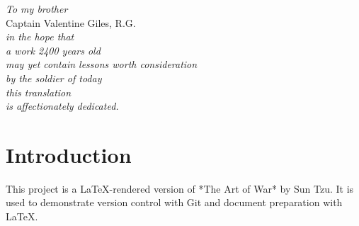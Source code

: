 \documentclass[12pt,a4paper]{book}
\begin{document}
\vspace{0em}

\noindent\hrulefill

\vspace{0em}

\begin{center}
\textit{To my brother} \\
\vspace{-0.3em}
Captain Valentine Giles, R.G. \\
\vspace{-0.3em}
\textit{in the hope that} \\
\vspace{-0.3em}
\textit{a work 2400 years old} \\
\vspace{-0.3em}
\textit{may yet contain lessons worth consideration} \\
\vspace{-0.3em}
\textit{by the soldier of today} \\
\vspace{-0.3em}
\textit{this translation} \\
\vspace{-0.3em}
\textit{is affectionately dedicated.}
\end{center}

\vspace{0em}

\noindent\hrulefill
\pagestyle{empty}

\newpage
\tableofcontents
\thispagestyle{empty}

\chapter{Introduction}

This project is a LaTeX-rendered version of *The Art of War* by Sun Tzu. It is used to demonstrate version control with Git and document preparation with LaTeX.
\end{document}
